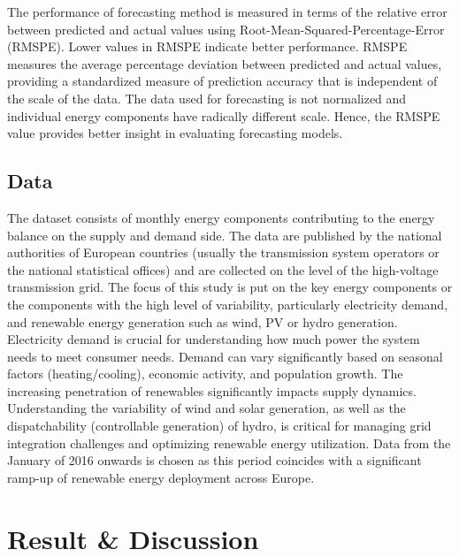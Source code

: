 \documentclass[acmtog]{acmart}
\begin{document}
The performance of forecasting method is measured in terms of the relative error between predicted and actual values using Root-Mean-Squared-Percentage-Error (RMSPE)\cite{botchkarev_performance_2019}. Lower values in RMSPE indicate better performance. RMSPE measures the average percentage deviation between predicted and actual values, providing a standardized measure of prediction accuracy that is independent of the scale of the data. The data used for forecasting is not normalized and individual energy components have radically different scale. Hence, the RMSPE value provides better insight in evaluating forecasting models.

\subsection{Data}

The dataset consists of monthly energy components contributing to the energy balance on the supply and demand side. The data are published by the national authorities of European countries (usually the transmission system operators or the national statistical offices) and are collected on the level of the high-voltage transmission grid. The focus of this study is put on the key energy components or the components with the high level of variability, particularly electricity demand, and renewable energy generation such as wind, PV or hydro generation.  Electricity demand  is crucial for understanding how much power the system needs to meet consumer needs. Demand can vary significantly based on seasonal factors (heating/cooling), economic activity, and population growth. The increasing penetration of renewables significantly impacts supply dynamics. Understanding the variability of wind and solar generation, as well as the dispatchability (controllable generation) of hydro, is critical for managing grid integration challenges and optimizing renewable energy utilization. Data from the January of 2016 onwards is chosen as this period coincides with a significant ramp-up of renewable energy deployment across Europe. 

\section{Result \& Discussion}
\end{document}
